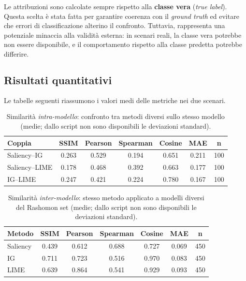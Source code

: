 \documentclass{article}
\begin{document}
Le attribuzioni sono calcolate sempre rispetto alla \textbf{classe vera}
(\textit{true label}). Questa scelta è stata fatta per garantire coerenza con
il \emph{ground truth} ed evitare che errori di classificazione alterino il
confronto. Tuttavia, rappresenta una potenziale minaccia alla validità esterna:
in scenari reali, la classe vera potrebbe non essere disponibile, e il
comportamento rispetto alla classe predetta potrebbe differire.

\subsection{Risultati quantitativi}
Le tabelle seguenti riassumono i valori medi delle metriche nei due scenari.

\begin{table}[h!]
      \centering
      \renewcommand{\arraystretch}{1.1}
      \begin{tabular}{lccccc c}
            \hline
            \textbf{Coppia} & \textbf{SSIM} & \textbf{Pearson} & \textbf{Spearman} & \textbf{Cosine} & \textbf{MAE} & \textbf{n} \\
            \hline
            Saliency–IG     & 0.263         & 0.529            & 0.194             & 0.651           & 0.211        & 100        \\
            Saliency–LIME   & 0.178         & 0.468            & 0.392             & 0.663           & 0.177        & 100        \\
            IG–LIME         & 0.247         & 0.421            & 0.224             & 0.780           & 0.167        & 100        \\
            \hline
      \end{tabular}
      \caption{Similarità \emph{intra-modello}: confronto tra metodi diversi sullo stesso modello (medie; dallo script non sono disponibili le deviazioni standard).}
      \label{tab:sim_intra}
\end{table}

\begin{table}[h!]
      \centering
      \renewcommand{\arraystretch}{1.1}
      \begin{tabular}{lccccc c}
            \hline
            \textbf{Metodo} & \textbf{SSIM} & \textbf{Pearson} & \textbf{Spearman} & \textbf{Cosine} & \textbf{MAE} & \textbf{n} \\
            \hline
            Saliency        & 0.439         & 0.612            & 0.688             & 0.727           & 0.069        & 450        \\
            IG              & 0.711         & 0.723            & 0.516             & 0.970           & 0.083        & 450        \\
            LIME            & 0.639         & 0.864            & 0.541             & 0.929           & 0.093        & 450        \\
            \hline
      \end{tabular}
      \caption{Similarità \emph{inter-modello}: stesso metodo applicato a modelli diversi del Rashomon set (medie; dallo script non sono disponibili le deviazioni standard).}
      \label{tab:sim_inter}
\end{table}
\end{document}
